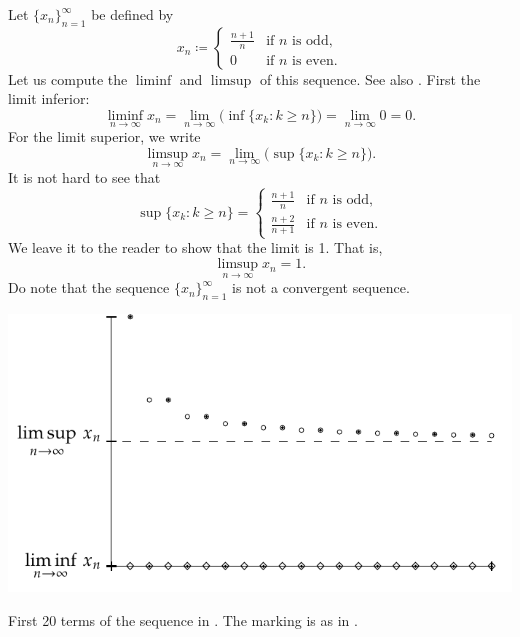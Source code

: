 \begin{example} \label{example:liminfsupex}
Let $\{ x_n \}_{n=1}^\infty$ be defined by
\begin{equation*}
x_n \coloneqq
\begin{cases}
\frac{n+1}{n} & \text{if } n \text{ is odd,} \\
0             & \text{if } n \text{ is even.}
\end{cases}
\end{equation*}
Let us compute the $\liminf$ and $\limsup$ of this sequence.  See also
.  First the
limit inferior:
\begin{equation*}
\liminf_{n\to\infty} x_n = 
\lim_{n\to\infty}
\bigl(
\inf \{ x_k : k \geq n \}
\bigr)
=
\lim_{n\to\infty} 0 = 0 .
\end{equation*}
For the limit superior, we write
\begin{equation*}
\limsup_{n\to\infty} x_n = 
\lim_{n\to\infty}
\bigl(
\sup \{ x_k : k \geq n \}
\bigr) .
\end{equation*}
It is not hard to see that
\begin{equation*}
\sup \{ x_k : k \geq n \} =
\begin{cases}
\frac{n+1}{n}   & \text{if } n \text{ is odd,} \\
\frac{n+2}{n+1} & \text{if } n \text{ is even.}
\end{cases}
\end{equation*}
We leave it to the reader to show that the limit is 1.  That is,
\begin{equation*}
\limsup_{n\to\infty} x_n = 1 .
\end{equation*}
Do note that the sequence $\{ x_n \}_{n=1}^\infty$ is not a convergent sequence.
\begin{myfigureht}
\includegraphics{figures/sequence-limsupliminf_an_bn-example}
\caption{First 20 terms of the sequence in .
The marking is as in .
\label{sequence-limsupliminf_an_bn-example}}
\end{myfigureht}
\end{example}

